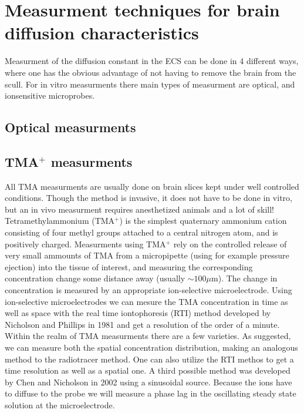 \documentclass[a4paper,english, 12pt, twoside]{article}
\begin{document}
\section{Measurment techniques for brain diffusion characteristics}
Measurment of the diffusion constant in the ECS can be done in 4 different ways, where one has the obvious advantage of not having to remove the brain from the scull. 
For in vitro measurments there main types of measurment are optical, and ionsensitive microprobes. 
\subsection{Optical measurments}

\subsection{TMA$^+$ measurments}
All TMA measurments are usually done on brain slices kept under well controlled conditions. 
Though the method is invasive, it does not have to be done in vitro, but an in vivo measurment requires anesthetized animals and a lot of skill!\\
Tetramethylammonium (TMA$^+$) is the simplest quaternary ammonium cation consisting of four methyl groups attached to a central nitrogen atom, and is positively charged. 
Measurments using TMA$^+$ rely on the controlled release of very small ammounts of TMA from a micropipette (using for example pressure ejection) into the tissue of interest, and measuring the corresponding concentration change some distance away (usually $\sim100\mu$m). 
The change in concentration is measured by an appropriate ion-selective microelectrode. 
Using ion-selective microelectrodes we can mesure the TMA concentration in time as well as space with the real time iontophoresis (RTI) method developed by Nicholson and Phillips in 1981 \cite{} and get a resolution of the order of a minute.\\
Within the realm of TMA measurments there are a few varieties. 
As suggested, we can measure both the spatial concentration distribution, making an analogous method to the radiotracer method. 
One can also utilize the RTI methos to get a time resolution as well as a spatial one. 
A third possible method was developed by Chen and Nicholson in 2002 \cite{chen2002measurement} using a sinusoidal source. 
Because the ions have to diffuse to the probe we will measure a phase lag in the oscillating steady state solution at the microelectrode. 
\end{document}
